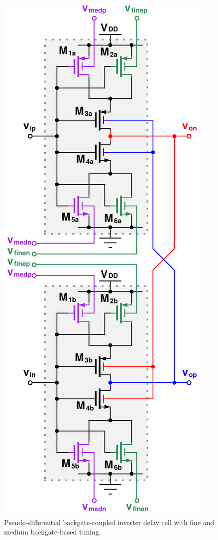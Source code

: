 			\begin{figure}[htb!]
			        \centering
			        \includegraphics[height=0.5\textheight, angle=0]{./figs/design/delay_cell_pd_inv}
			    \caption{Pseudo-differential backgate-coupled inverter delay cell with fine and medium backgate-based tuning.}
			    \label{fig:delay_cell_pd_inv}
			\end{figure}



